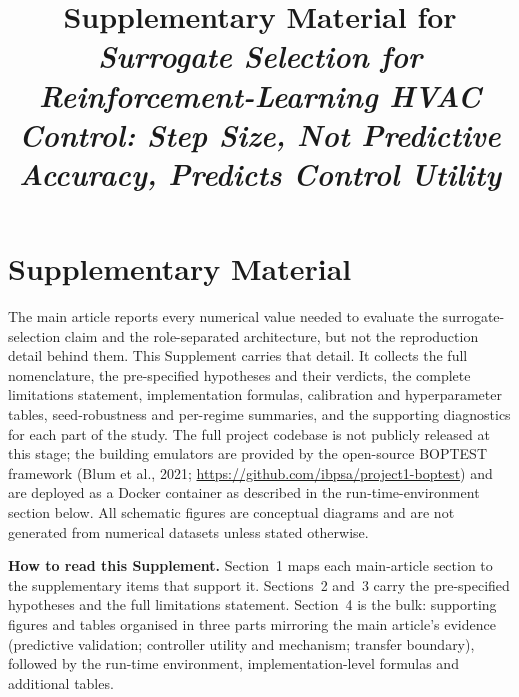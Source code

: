 \documentclass[11pt,a4paper]{article}
\title{Supplementary Material for\\[2pt]
\emph{Surrogate Selection for Reinforcement-Learning HVAC Control: Step Size,
Not Predictive Accuracy, Predicts Control Utility}}
\author{}
\date{}
\begin{document}
\maketitle
\section*{Supplementary Material}
The main article reports every numerical value needed to evaluate the surrogate-selection claim and the role-separated architecture, but not the reproduction detail behind them. This Supplement carries that detail. It collects the full nomenclature, the pre-specified hypotheses and their verdicts, the complete limitations statement, implementation formulas, calibration and hyperparameter tables, seed-robustness and per-regime summaries, and the supporting diagnostics for each part of the study. The full project codebase is not publicly released at this stage; the building emulators are provided by the open-source BOPTEST framework (Blum et al., 2021; \url{https://github.com/ibpsa/project1-boptest}) and are deployed as a Docker container as described in the run-time-environment section below. All schematic figures are conceptual diagrams and are not generated from numerical datasets unless stated otherwise.\par
\medskip\noindent\textbf{How to read this Supplement.} Section~1 maps each main-article section to the supplementary items that support it. Sections~2 and~3 carry the pre-specified hypotheses and the full limitations statement. Section~4 is the bulk: supporting figures and tables organised in three parts mirroring the main article's evidence (predictive validation; controller utility and mechanism; transfer boundary), followed by the run-time environment, implementation-level formulas and additional tables.\par
\medskip\noindent{}\par\medskip
\end{document}

